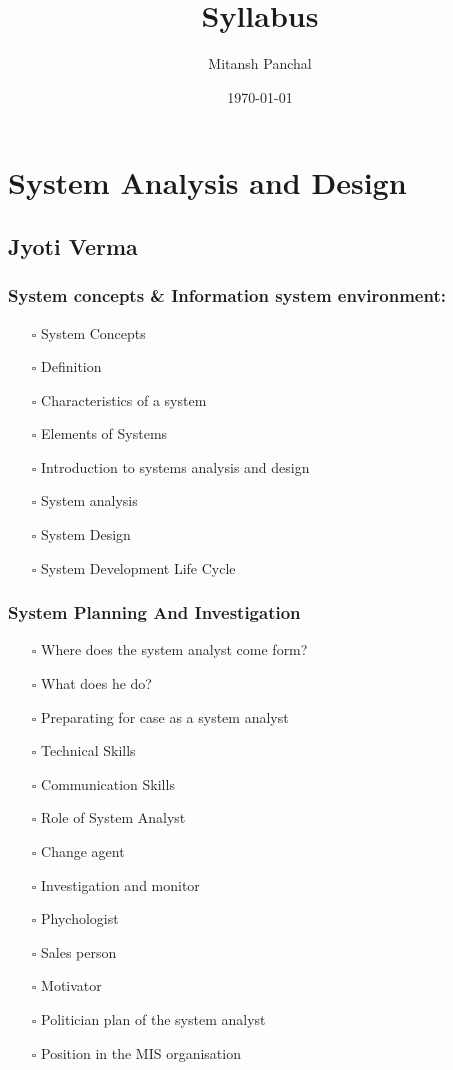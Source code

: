 \documentclass[11pt]{article}
\author{Mitansh Panchal}
\date{\today}
\title{Syllabus}
\begin{document}
\maketitle
\tableofcontents


\section{System Analysis and Design}
\label{sec:org961a418}
\subsection{Jyoti Verma}
\label{sec:orgd143caf}
\subsubsection{System concepts \& Information system environment:}
\label{sec:org3d3a5e5}
\begin{itemize}
\item[{$\square$}] System Concepts
\item[{$\square$}] Definition
\item[{$\square$}] Characteristics of a system
\item[{$\square$}] Elements of Systems
\item[{$\square$}] Introduction to systems analysis and design
\item[{$\square$}] System analysis
\item[{$\square$}] System Design
\item[{$\square$}] System Development Life Cycle
\end{itemize}

\subsubsection{System Planning And Investigation}
\label{sec:org1e4e778}
\begin{itemize}
\item[{$\square$}] Where does the system analyst come form?
\item[{$\square$}] What does he do?
\item[{$\square$}] Preparating for case as a system analyst
\item[{$\square$}] Technical Skills
\item[{$\square$}] Communication Skills
\item[{$\square$}] Role of System Analyst
\item[{$\square$}] Change agent
\item[{$\square$}] Investigation and monitor
\item[{$\square$}] Phychologist
\item[{$\square$}] Sales person
\item[{$\square$}] Motivator
\item[{$\square$}] Politician plan of the system analyst
\item[{$\square$}] Position in the MIS organisation
\end{itemize}
\end{document}
